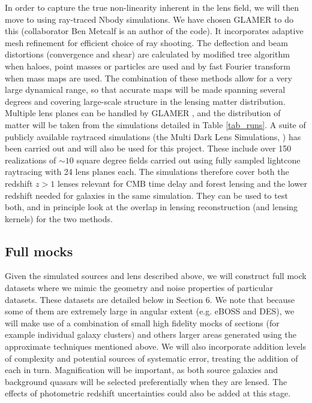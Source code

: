 In order to capture the true non-linearity inherent in the lens field,
 we will then move to using ray-traced  Nbody simulations. We have chosen  
GLAMER   \citep{metcalf2014} to do this (collaborator Ben Metcalf is an 
author of the code). It incorporates adaptive mesh refinement for
efficient choice of ray shooting. The deflection and beam distortions 
(convergence and shear) are calculated by modified tree algorithm when haloes,
 point masses or particles are used and by fast Fourier transform when 
mass maps are used. The combination of these methods allow for a very 
large dynamical range, so that accurate  maps will be made
spanning several degrees and covering large-scale
structure in the lensing matter distribution. Multiple lens planes can be
handled by GLAMER \citep{petkova2014}, and the distribution of matter
will be taken from the simulations detailed in Table \ref{tab_runs}. A suite 
of publicly available raytraced simulations (the Multi Dark Lens Simulations,
\citealt{giocoli2016}) has been carried out and will also be used for 
this project. These include over 150 realizations of $\sim 10$ square
degree fields carried out using fully sampled lightcone raytracing
with 24 lens planes each. The simulations therefore cover both the
redshift $z > 1$ lenses relevant for CMB time delay 
and forest lensing and the lower 
redshift needed for galaxies in the same simulation. They can be used to
test both, and in principle look at the overlap in lensing reconstruction
(and lensing kernels) for the two methods. 


\subsection{Full mocks}

Given the simulated sources and lens described above, we will construct
full mock datasets where we mimic the geometry and noise properties
of particular datasets. These datasets are detailed below in Section 6.
We note that because some of them are extremely large in
angular extent (e.g. eBOSS and DES), we will make use of a combination of
small high fidelity mocks of sections (for example individual 
galaxy clusters) and others larger areas generated using the approximate 
techniques mentioned above.
We will also incorporate addition levels of
complexity and potential sources of systematic
error, treating the addition of each in turn. 
Magnification will be important, as both source
galaxies and background quasars will be selected preferentially when
they are lensed. The effects of photometric redshift uncertainties
could also  be added 
at this stage.   
